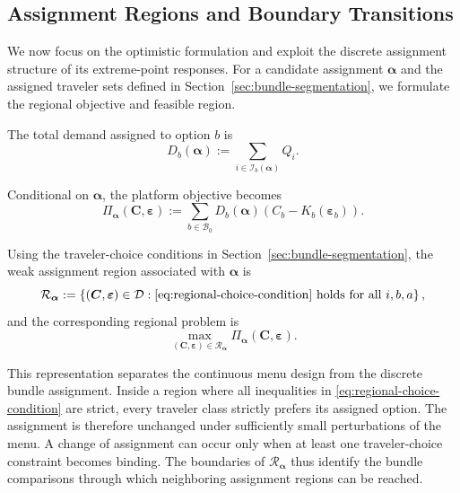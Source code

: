 \documentclass{article}
\begin{document}
\subsection{Assignment Regions and Boundary Transitions}
\label{sec:assignment-regions}

We now focus on the optimistic formulation and exploit the discrete
assignment structure of its extreme-point responses. For a candidate
assignment $\bm\alpha$ and the assigned traveler sets defined in
Section~\ref{sec:bundle-segmentation}, we formulate the regional objective
and feasible region.

The total demand assigned to option $b$ is
\begin{equation}
    D_b(\bm\alpha)
    :=
    \sum_{i\in\mathcal I_b(\bm\alpha)}
    Q_i.
    \label{eq:regional-demand}
\end{equation}

Conditional on $\bm\alpha$, the platform objective becomes
\begin{equation}
    \Pi_{\bm\alpha}(\bm C,\bm\varepsilon)
    :=
    \sum_{b\in\mathcal B_0}
    D_b(\bm\alpha)
    \left(
        C_b-K_b(\bm\varepsilon_b)
    \right).
    \label{eq:regional-objective}
\end{equation}

Using the traveler-choice conditions in Section~\ref{sec:bundle-segmentation},
the weak assignment region associated with $\bm\alpha$ is
\begin{equation}
    \mathcal R_{\bm\alpha}
    :=
    \left\{
        (\bm C,\bm\varepsilon)\in\mathcal D:
        \eqref{eq:regional-choice-condition}
        \text{ holds for all }i,b,a
    \right\},
    \label{eq:assignment-region}
\end{equation}
and the corresponding regional problem is
\begin{equation}
    \max_{(\bm C,\bm\varepsilon)\in\mathcal R_{\bm\alpha}}
    \Pi_{\bm\alpha}(\bm C,\bm\varepsilon).
    \label{eq:regional-problem}
\end{equation}

This representation separates the continuous menu design from the
discrete bundle assignment. Inside a region where all inequalities in
\eqref{eq:regional-choice-condition} are strict, every traveler class
strictly prefers its assigned option. The assignment is therefore
unchanged under sufficiently small perturbations of the menu. A change
of assignment can occur only when at least one traveler-choice
constraint becomes binding. The boundaries of
$\mathcal R_{\bm\alpha}$ thus identify the bundle comparisons through
which neighboring assignment regions can be reached.
\end{document}
